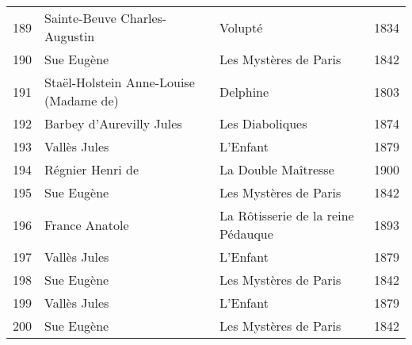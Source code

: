 \begin{center}
\begin{small}
\begin{longtable}{l l l l}
  189 & Sainte-Beuve Charles-Augustin & Volupté & 1834 \\
  190 & Sue Eugène & Les Mystères de Paris & 1842 \\
  191 & Staël-Holstein Anne-Louise (Madame de) & Delphine & 1803 \\
  192 & Barbey d'Aurevilly Jules & Les Diaboliques & 1874 \\
  193 & Vallès Jules & L'Enfant & 1879 \\
  194 & Régnier Henri de & La Double Maîtresse & 1900 \\
  195 & Sue Eugène & Les Mystères de Paris & 1842 \\
  196 & France Anatole & La Rôtisserie de la reine Pédauque & 1893 \\
  197 & Vallès Jules & L'Enfant & 1879 \\
  198 & Sue Eugène & Les Mystères de Paris & 1842 \\
  199 & Vallès Jules & L'Enfant & 1879 \\
  200 & Sue Eugène & Les Mystères de Paris & 1842 \\
  \bottomrule
\end{longtable}
\end{small}
\end{center}


